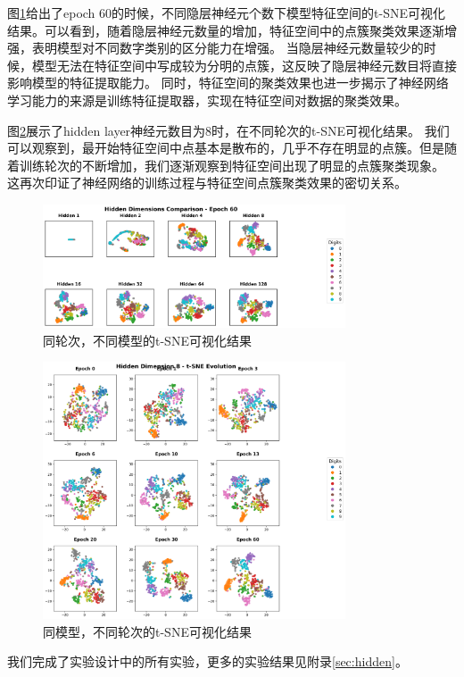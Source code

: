 \documentclass[12pt,a4paper]{article}
\begin{document}
图\ref{fig:60}给出了epoch 60的时候，不同隐层神经元个数下模型特征空间的t-SNE可视化结果。可以看到，随着隐层神经元数量的增加，特征空间中的点簇聚类效果逐渐增强，表明模型对不同数字类别的区分能力在增强。
当隐层神经元数量较少的时候，模型无法在特征空间中写成较为分明的点簇，这反映了隐层神经元数目将直接影响模型的特征提取能力。
同时，特征空间的聚类效果也进一步揭示了神经网络学习能力的来源是训练特征提取器，实现在特征空间对数据的聚类效果。

图\ref{fig:8}展示了hidden layer神经元数目为8时，在不同轮次的t-SNE可视化结果。
我们可以观察到，最开始特征空间中点基本是散布的，几乎不存在明显的点簇。但是随着训练轮次的不断增加，我们逐渐观察到特征空间出现了明显的点簇聚类现象。
这再次印证了神经网络的训练过程与特征空间点簇聚类效果的密切关系。
\begin{figure}[h]
    \centering
    \includegraphics[width=0.8\textwidth]{../images/pa/tsne_comparison_epoch_60.png}
    \caption{同轮次，不同模型的t-SNE可视化结果}
    \label{fig:60}
\end{figure}

\begin{figure}[h]
    \centering
    \includegraphics[width=0.8\textwidth]{../images/pa/tsne_evolution_hidden_8.png}
    \caption{同模型，不同轮次的t-SNE可视化结果}
    \label{fig:8}
\end{figure}
我们完成了实验设计中的所有实验，更多的实验结果见附录\ref{sec:hidden}。
\end{document}
